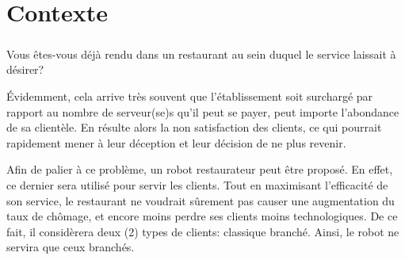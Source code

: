 \chapter{Contexte}
 \paragraph{}
 Vous êtes-vous déjà rendu dans un restaurant au sein
 duquel le service laissait à désirer? \par 
Évidemment, cela arrive très souvent que l'établissement
soit surchargé par rapport au nombre de serveur(se)s 
qu'il peut se payer, peut importe l'abondance de sa 
clientèle. En résulte alors la non satisfaction des 
clients, ce qui pourrait rapidement mener à leur 
déception et leur décision de ne plus revenir. \par 
Afin de palier à ce problème, un robot restaurateur 
peut être proposé. En effet, ce dernier sera utilisé 
pour servir les clients. Tout en maximisant l'efficacité
de son service, le restaurant ne voudrait sûrement pas
causer une augmentation du taux de chômage, et encore
moins perdre ses clients moins technologiques. De ce fait,
il considèrera deux (2) types de clients: classique 
branché. Ainsi, le robot ne servira que ceux branchés.
\par 